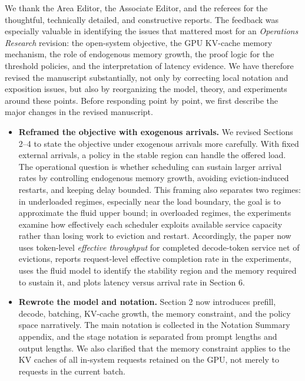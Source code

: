 We thank the Area Editor, the Associate Editor, and the referees for the thoughtful, technically detailed, and constructive reports. The feedback was especially valuable in identifying the issues that mattered most for an \emph{Operations Research} revision: the open-system objective, the GPU KV-cache memory mechanism, the role of endogenous memory growth, the proof logic for the threshold policies, and the interpretation of latency evidence. We have therefore revised the manuscript substantially, not only by correcting local notation and exposition issues, but also by reorganizing the model, theory, and experiments around these points. Before responding point by point, we first describe the major changes in the revised manuscript.

\begin{itemize}
    \item \textbf{Reframed the objective with exogenous arrivals.} We revised Sections 2--4 to state the objective under exogenous arrivals more carefully. With fixed external arrivals, a policy in the stable region can handle the offered load. The operational question is whether scheduling can sustain larger arrival rates by controlling endogenous memory growth, avoiding eviction-induced restarts, and keeping delay bounded. This framing also separates two regimes: in underloaded regimes, especially near the load boundary, the goal is to approximate the fluid upper bound; in overloaded regimes, the experiments examine how effectively each scheduler exploits available service capacity rather than losing work to eviction and restart. Accordingly, the paper now uses token-level \emph{effective throughput} for completed decode-token service net of evictions, reports request-level effective completion rate in the experiments, uses the fluid model to identify the stability region and the memory required to sustain it, and plots latency versus arrival rate in Section 6.
    \item \textbf{Rewrote the model and notation.} Section 2 now introduces prefill, decode, batching, KV-cache growth, the memory constraint, and the policy space narratively. The main notation is collected in the Notation Summary appendix, and the stage notation is separated from prompt lengths and output lengths. We also clarified that the memory constraint applies to the KV caches of all in-system requests retained on the GPU, not merely to requests in the current batch.

\end{itemize}
